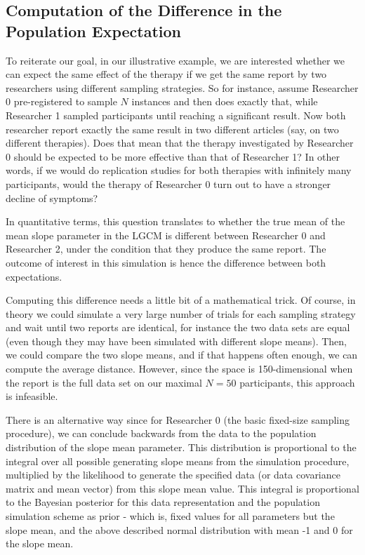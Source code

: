 \documentclass[man]{apa7}
\theoremstyle{definition}
\begin{document}
\subsection{Computation of the Difference in the Population Expectation}
To reiterate our goal, in our illustrative example, we are interested whether we can expect the same effect of the therapy if we get the same report by two researchers using different sampling strategies. So for instance, assume Researcher 0 pre-registered to sample $N$ instances and then does exactly that, while Researcher 1 sampled participants until reaching a significant result. Now both researcher report exactly the same result in two different articles (say, on two different therapies). Does that mean that the therapy investigated by Researcher 0 should be expected to be more effective than that of Researcher 1? In other words, if we would do replication studies for both therapies with infinitely many participants, would the therapy of Researcher 0 turn out to have a stronger decline of symptoms? 

In quantitative terms, this question translates to whether the true mean of the mean slope parameter in the LGCM is different between Researcher 0 and Researcher 2, under the condition that they produce the same report. The outcome of interest in this simulation is hence the difference between both expectations.

Computing this difference needs a little bit of a mathematical trick. Of course, in theory we could simulate a very large number of trials for each sampling strategy and wait until two reports are identical, for instance the two data sets are equal (even though they may have been simulated with different slope means). Then, we could compare the two slope means, and if that happens often enough, we can compute the average distance. However, since the space is 150-dimensional when the report is the full data set on our maximal $N=50$ %
participants, this approach is infeasible. 

There is an alternative way since for Researcher 0 (the basic fixed-size sampling procedure), we can conclude backwards from the data to the population distribution of the slope mean parameter. This distribution is proportional to the integral over all possible generating slope means from the simulation procedure, multiplied by the likelihood to generate the specified data (or data covariance matrix and mean vector) from this slope mean value. This integral is proportional to the Bayesian posterior for this data representation and the population simulation scheme as prior - which is, fixed values for all parameters but the slope mean, and the above described normal distribution with mean -1 and 0 for the slope mean. 
\end{document}
